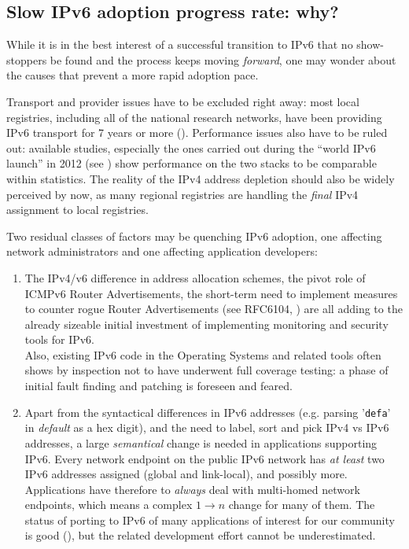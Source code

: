 \subsection{Slow IPv6 adoption progress rate: why?}
While it is in the best interest of a successful transition to IPv6 that
no show-stoppers be found and the process keeps moving {\it forward},
one may wonder about the causes that prevent a more rapid adoption pace.\par
Transport and provider issues have to be excluded right away: most
local registries, including all of the national research networks, have been
providing IPv6 transport for 7 years or more (\cite{ripeness}). Performance issues also have to
be ruled out: available studies, especially the ones carried out during the
``world IPv6 launch'' in 2012 (see \cite{wdayperf}) show performance on 
the two stacks to be comparable within statistics. The reality of the IPv4 
address depletion
should also be widely perceived by now, as many regional registries are
handling the {\it final} IPv4 assignment to local registries.\par
Two residual classes of factors may be quenching IPv6 adoption, one
affecting network administrators and one affecting application developers:
\begin{enumerate}
\item {\small
The IPv4/v6 difference in address allocation schemes, the pivot role of
ICMPv6 Router Advertisements, the short-term
need to implement measures to counter rogue Router Advertisements 
(see RFC6104, \cite{rfc}) are all adding to the already sizeable initial 
investment of implementing monitoring and security tools for IPv6.\\
Also, existing IPv6 code in the Operating Systems and related tools often
shows by inspection not to have underwent full coverage testing:
a phase of initial fault finding and patching is foreseen and feared.
}
\item {\small
Apart from the syntactical differences in IPv6 addresses (e.g. parsing
'{\tt defa}' in {\it default} as a hex digit), and the need to label, sort and 
pick IPv4 vs IPv6 addresses, a large {\it semantical} change is
needed in applications supporting IPv6. Every network endpoint on the
public IPv6 network has {\it at least} two IPv6 addresses assigned (global
and link-local), and possibly more. Applications have therefore
to {\it always} deal with multi-homed network endpoints, which means a complex
$1\rightarrow n$ change for many of them. The status of porting to IPv6 of
many applications of interest for our community is good (\cite{readiness}),
but the related development effort cannot be underestimated.
}
\end{enumerate}
